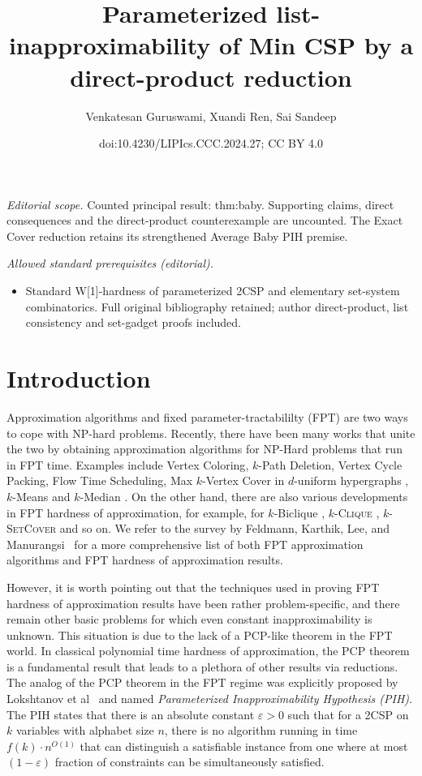 \documentclass[10pt,a4paper]{article}
\title{Parameterized list-inapproximability of Min CSP by a direct-product reduction}
\author{Venkatesan Guruswami, Xuandi Ren, Sai Sandeep}
\date{doi:10.4230/LIPIcs.CCC.2024.27; CC BY 4.0}
\newcommand{\kclique}{\textsc{$k$-Clique}}
\newcommand{\ksetcover}{\textsc{$k$-SetCover}}
\begin{document}
\maketitle
\noindent\textit{Editorial scope.} Counted principal result: thm:baby. Supporting claims, direct consequences and the direct-product counterexample are uncounted. The Exact Cover reduction retains its strengthened Average Baby PIH premise.\par\medskip
\noindent\textit{Allowed standard prerequisites (editorial).}\begin{itemize}
\item Standard W[1]-hardness of parameterized 2CSP and elementary set-system combinatorics. Full original bibliography retained; author direct-product, list consistency and set-gadget proofs included.
\end{itemize}\medskip
\section{Introduction}

\noindent Approximation algorithms and fixed parameter-tractabililty (FPT) are two ways to cope with NP-hard problems. Recently, there have been many works that unite the two by obtaining approximation algorithms for NP-Hard problems that run in FPT time. Examples include {\sc Vertex Coloring}\cite{DHK05,Mar08}, {\sc $k$-Path Deletion}\cite{Lee19}, {\sc Vertex Cycle Packing}\cite{Lok+17}, {\sc Flow Time Scheduling}\cite{Wie18}, {\sc Max $k$-Vertex Cover} in $d$-uniform hypergraphs \cite{SF17,Man19}, {\sc $k$-Means} and {\sc $k$-Median} \cite{LiS16,BPR+17,KMN+04,ANSW20,CGTS02,CGK+19}. 
On the other hand, there are also various developments in FPT hardness of approximation, for example, for {\sc $k$-Biclique} \cite{Lin18}, \kclique{} \cite{CCK+17, Lin21, LRSW22, KK22, LRSW23, CFL+23}, \ksetcover{} \cite{CCK+17,CL19,KLM19,Lin19,KN21,LRSW23a} and so on.
We refer to the survey by Feldmann, Karthik, Lee, and Manurangsi~\cite{FKLM20} for a more comprehensive list of both FPT approximation algorithms and FPT hardness of approximation results.

However, it is worth pointing out that the techniques used in proving FPT hardness of approximation results have been rather problem-specific, and there remain other basic problems for which even constant inapproximability is unknown. This situation is due to the lack of a PCP-like theorem in the FPT world. In classical polynomial time hardness of approximation, the PCP theorem is a fundamental result that leads to a plethora of other results via reductions. The analog of the PCP theorem in the FPT regime was explicitly proposed by Lokshtanov et al~\cite{LRSZ20} and named \emph{Parameterized Inapproximability Hypothesis (PIH)}. The PIH states that there is an absolute constant $\varepsilon > 0$ such that for a 2CSP on $k$ variables with alphabet size $n$, there is no algorithm running in time $f(k)\cdot n^{O(1)}$ that can distinguish a satisfiable instance from one where at most $(1-\varepsilon)$ fraction of constraints can be simultaneously satisfied.
\end{document}
